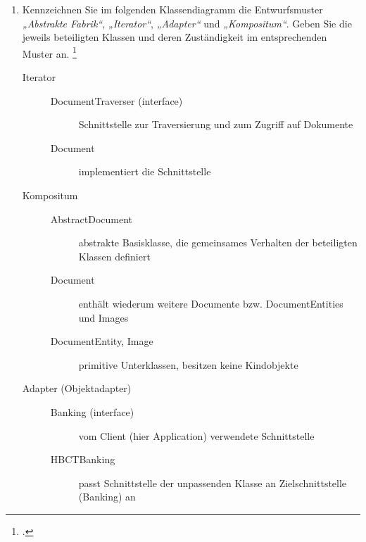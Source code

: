 \documentclass{lehramt-informatik}
\begin{document}
\begin{enumerate}


\item Kennzeichnen Sie im folgenden Klassendiagramm die Entwurfsmuster
\emph{„Abstrakte Fabrik“}, \emph{„Iterator“}, \emph{„Adapter“} und
\emph{„Kompositum“}. Geben Sie die jeweils beteiligten Klassen und deren
Zuständigkeit im entsprechenden Muster an.
\footcite{examen:66116:2016:03}

\begin{antwort}

\begin{description}

%

\item[Iterator] \strut

\begin{description}
\item[DocumentTraverser (interface)]
Schnittstelle zur Traversierung und zum Zugriff auf Dokumente

\item[Document]
implementiert die Schnittstelle
\end{description}

%

\item[Kompositum] \strut

\begin{description}
\item[AbstractDocument]
abstrakte Basisklasse, die gemeinsames Verhalten der beteiligten
Klassen definiert

\item[Document]
enthält wiederum weitere Documente bzw. DocumentEntities und Images

\item[DocumentEntity, Image]
primitive Unterklassen, besitzen keine Kindobjekte
\end{description}

%

\item[Adapter (Objektadapter)] \strut

\begin{description}
\item[Banking (interface)]
vom Client (hier Application) verwendete Schnittstelle

\item[HBCTBanking]
passt Schnittstelle der unpassenden Klasse an Zielschnittstelle
(Banking) an


\end{description}
\end{description}
\end{antwort}
\end{enumerate}
\end{document}
